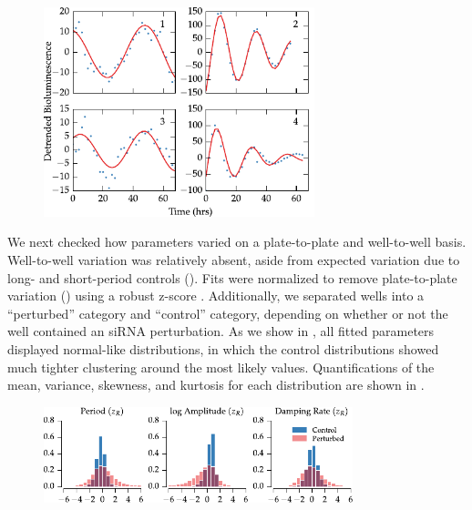 \begin{figure}[tbp]
  \begin{center}
    \includegraphics[width=0.7\textwidth]{chap6/figures/r2_vs_damping_b.pdf}
  \end{center}
\label{fig:fit_quality_b}
\end{figure}

We next checked how parameters varied on a plate-to-plate and well-to-well basis.
Well-to-well variation was relatively absent, aside from expected variation due to long- and short-period controls ().
Fits were normalized to remove plate-to-plate variation () using a robust z-score \cite{Birmingham2009}.
Additionally, we separated wells into a ``perturbed'' category and ``control'' category, depending on whether or not the well contained an siRNA perturbation.
As we show in , all fitted parameters displayed normal-like distributions, in which the control distributions showed much tighter clustering around the most likely values.
Quantifications of the mean, variance, skewness, and kurtosis for each distribution are shown in .

\begin{figure}[tbp]
  \begin{center}
    \includegraphics[width=0.8\textwidth]{chap6/figures/fitted_parameters.pdf}
  \end{center}
\label{fig:fit_distributions}
\end{figure}

